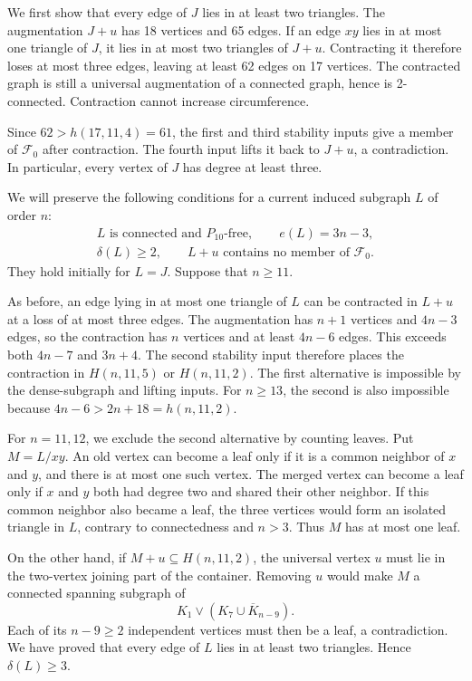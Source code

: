 \documentclass[12pt]{article}
\newcommand{\Fzero}{\mathcal F_0}
\newcommand{\Ic}{\overline K}
\begin{document}
We first show that every edge of $J$ lies in at least two
triangles. The augmentation $J+u$ has 18 vertices and 65 edges.
If an edge $xy$ lies in at most one triangle of $J$, it lies
in at most two triangles of $J+u$. Contracting it therefore
loses at most three edges, leaving at least 62 edges on
17 vertices. The contracted graph is still a universal
augmentation of a connected graph, hence is 2-connected.
Contraction cannot increase circumference.

Since $62>h(17,11,4)=61$, the first and third stability
inputs give a member of $\Fzero$ after contraction.
The fourth input lifts it back to $J+u$, a contradiction.
In particular, every vertex of $J$ has degree at least three.

We will preserve the following conditions for a current induced
subgraph $L$ of order $n$:
\begin{equation}\label{eq:invariant}
 \begin{gathered}
 L\text{ is connected and }P_{10}\text{-free},\qquad e(L)=3n-3,\\
 \delta(L)\geq2,\qquad L+u\text{ contains no member of }\Fzero.
 \end{gathered}
\end{equation}
They hold initially for $L=J$. Suppose that $n\geq11$.

As before, an edge lying in at most one triangle of $L$
can be contracted in $L+u$ at a loss of at most three edges.
The augmentation has $n+1$ vertices and $4n-3$ edges,
so the contraction has $n$ vertices and at least $4n-6$
edges. This exceeds both $4n-7$ and $3n+4$.
The second stability input therefore places the contraction
in $H(n,11,5)$ or $H(n,11,2)$. The first alternative is
impossible by the dense-subgraph and lifting inputs.
For $n\geq13$, the second is also impossible because
$4n-6>2n+18=h(n,11,2)$.

For $n=11,12$, we exclude the second alternative by counting
leaves. Put $M=L/xy$. An old vertex can become a leaf only
if it is a common neighbor of $x$ and $y$, and there is at
most one such vertex. The merged vertex can become a leaf
only if $x$ and $y$ both had degree two and shared their other
neighbor. If this common neighbor also became a leaf, the
three vertices would form an isolated triangle in $L$,
contrary to connectedness and $n>3$. Thus $M$ has at most
one leaf.

On the other hand, if $M+u\subseteq H(n,11,2)$, the universal
vertex $u$ must lie in the two-vertex joining part of the
container. Removing $u$ would make $M$ a connected spanning
subgraph of
\[
 K_1\vee(K_7\cup\Ic_{n-9}).
\]
Each of its $n-9\geq2$ independent vertices must then be a
leaf, a contradiction. We have proved that every edge of
$L$ lies in at least two triangles. Hence $\delta(L)\geq3$.
\end{document}
